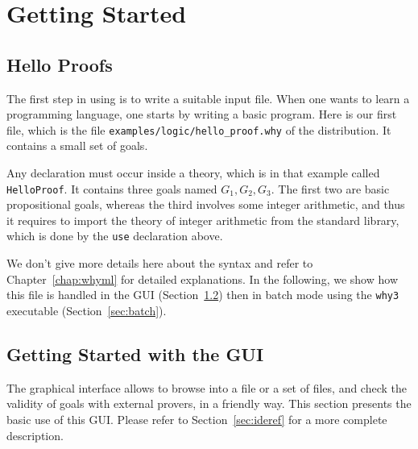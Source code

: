 \chapter{Getting Started}
\label{chap:starting}

\section{Hello Proofs}

The first step in using \why is to write a suitable input
file. When one wants to learn a programming language, one starts by
writing a basic program. Here is our first \why file, which is the file
\texttt{examples/logic/hello\_proof.why} of the distribution.
It contains a small set of goals.


Any declaration must occur
inside a theory, which is in that example called \texttt{HelloProof}.
It contains three goals
named $G_1,G_2,G_3$. The first two are basic propositional goals,
whereas the third involves some integer arithmetic, and thus it
requires to import the theory of integer arithmetic from the \why
standard library, which is done by the \texttt{use} declaration above.

We don't give more details here about the syntax and refer to
Chapter~\ref{chap:whyml} for detailed explanations. In the following,
we show how this file is handled in the \why GUI
(Section~\ref{sec:gui}) then in batch mode using the \texttt{why3}
executable (Section~\ref{sec:batch}).


\section{Getting Started with the GUI}
\label{sec:gui}

The graphical interface allows to browse into a file or a set of
files, and check the validity of goals with external provers, in a
friendly way. This section presents the basic use of this GUI. Please
refer to Section~\ref{sec:ideref} for a more complete description.

